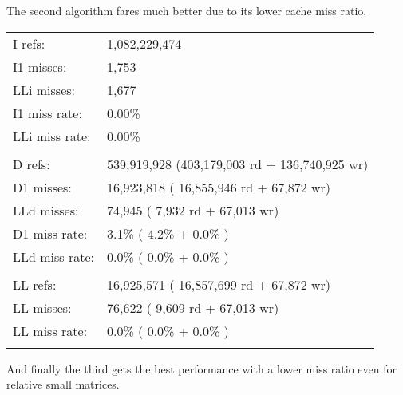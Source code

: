 \documentclass[a4paper]{article}
\begin{document}
The second algorithm fares much better due to its lower cache miss ratio.
\linebreak
\begin{tabular}{ ll }

I   refs:    &  1,082,229,474 \\
I1  misses:   &         1,753 \\
LLi misses:    &        1,677 \\
I1  miss rate:  &        0.00\% \\
LLi miss rate:   &       0.00\% \\
 & \\
D   refs:   &     539,919,928  (403,179,003 rd   + 136,740,925 wr) \\
D1  misses:  &     16,923,818  ( 16,855,946 rd   +      67,872 wr) \\
LLd misses:   &        74,945  (      7,932 rd   +      67,013 wr) \\
D1  miss rate:  &         3.1\% (        4.2\%     +         0.0\%  ) \\
LLd miss rate:   &        0.0\% (        0.0\%     +         0.0\%  ) \\
 & \\
LL refs: &          16,925,571  ( 16,857,699 rd   +      67,872 wr) \\
LL misses:  &          76,622  (      9,609 rd   +      67,013 wr) \\
LL miss rate: &            0.0\% (        0.0\%     +         0.0\%  ) \\
\linebreak 
\linebreak
\end{tabular}

And finally the third gets the best performance with a lower miss ratio even for relative small matrices.
\end{document}
